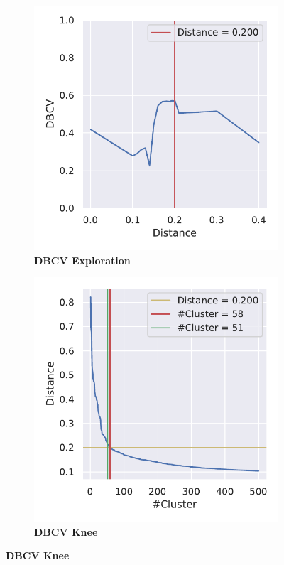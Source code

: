 \begin{figure}[!hbt]
    \centering
    \begin{subfigure}[b]{0.475\textwidth}
        \caption[\Acrshort{DBCV} Exploration]{\textbf{\Acrshort{DBCV} Exploration}}
        \label{subfig:PCA_Cluster_DBCV_Explo_4}            \includegraphics[width=\textwidth]{PCA/Cluster_DBCV_Segment_4.pdf}
    \end{subfigure}
    \hfill
    \begin{subfigure}[b]{0.475\textwidth}
        \caption[\Acrshort{DBCV} Knee]{\textbf{\Acrshort{DBCV} Knee}}
        \label{subfig:PCA_Cluster_DBCV_Elbow_4}            \includegraphics[width=\textwidth]{PCA/Cluster_Elbow_DBCV_Segment_4.pdf}

\end{subfigure}
\end{figure}
